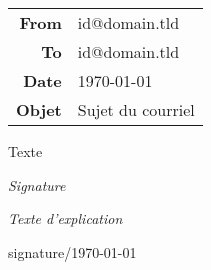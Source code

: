 \documentclass[16pt,parskip=half]{scrartcl}
\begin{document}
\noindent\begin{tabular}{>{\bfseries}r!{:}l}
	From	& id@domain.tld\\
	To		& id@domain.tld\\
	Date	& \today \\
	Objet	& Sujet du courriel
\end{tabular}
\par\vspace{1em}\noindent\hrulefill\vspace{2em}

Texte

\bigskip\hfill\emph{Signature}

\vfill{\tiny\itshape
	Texte d'explication
\par\hfill signature/\today}
\end{document}
